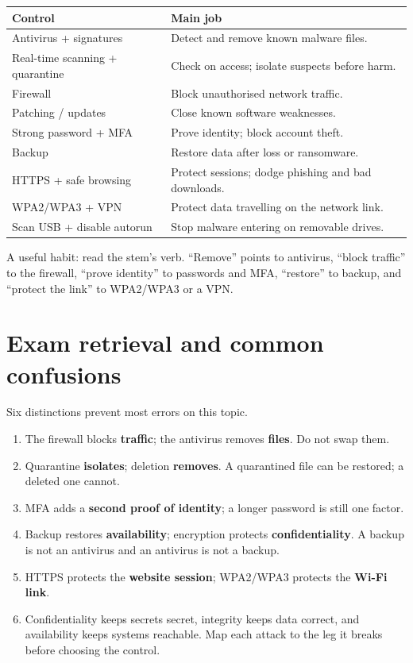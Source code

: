 \begin{center}
\begin{tabular}{p{}p{}}
\toprule
\textbf{Control} & \textbf{Main job} \\
\midrule
Antivirus + signatures & Detect and remove known malware files. \\
Real-time scanning + quarantine & Check on access; isolate suspects before harm. \\
Firewall & Block unauthorised network traffic. \\
Patching / updates & Close known software weaknesses. \\
Strong password + MFA & Prove identity; block account theft. \\
Backup & Restore data after loss or ransomware. \\
HTTPS + safe browsing & Protect sessions; dodge phishing and bad downloads. \\
WPA2/WPA3 + VPN & Protect data travelling on the network link. \\
Scan USB + disable autorun & Stop malware entering on removable drives. \\
\bottomrule
\end{tabular}
\end{center}

A useful habit: read the stem's verb. ``Remove'' points to antivirus,
``block traffic'' to the firewall, ``prove identity'' to passwords and MFA,
``restore'' to backup, and ``protect the link'' to WPA2/WPA3 or a VPN.

\section{Exam retrieval and common confusions}
Six distinctions prevent most errors on this topic.
\begin{enumerate}
  \item The firewall blocks \textbf{traffic}; the antivirus removes
    \textbf{files}. Do not swap them.
  \item Quarantine \textbf{isolates}; deletion \textbf{removes}. A
    quarantined file can be restored; a deleted one cannot.
  \item MFA adds a \textbf{second proof of identity}; a longer password is
    still one factor.
  \item Backup restores \textbf{availability}; encryption protects
    \textbf{confidentiality}. A backup is not an antivirus and an antivirus
    is not a backup.
  \item HTTPS protects the \textbf{website session}; WPA2/WPA3 protects the
    \textbf{Wi-Fi link}.
  \item Confidentiality keeps secrets secret, integrity keeps data correct,
    and availability keeps systems reachable. Map each attack to the leg it
    breaks before choosing the control.
\end{enumerate}


